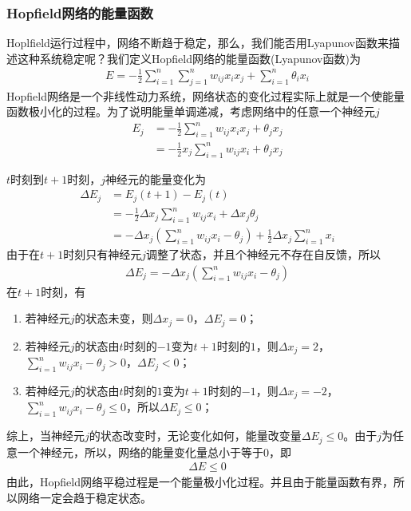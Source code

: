 {        \subsubsection{Hopfield网络的能量函数}
            \par
            Hoplfield运行过程中，网络不断趋于稳定，那么，我们能否用Lyapunov函数来描述这种系统稳定呢？我们定义Hopfield网络的能量函数(Lyapunov函数)为
            \begin{align*}
            E = -\frac{1}{2} \sum_{i=1}^n\sum_{j=1}^n w_{ij}x_ix_j+\sum_{i=1}^n\theta_ix_i
            \end{align*}
            Hopfield网络是一个非线性动力系统，网络状态的变化过程实际上就是一个使能量函数极小化的过程。为了说明能量单调递减，考虑网络中的任意一个神经元$j$
            \begin{align*}
            E_j & = -\frac{1}{2}\sum_{i=1}^n w_{ij}x_ix_j + \theta_jx_j\\
            & =-\frac{1}{2} x_j\sum_{i=1}^n w_{ij}x_i + \theta_j x_j
            \end{align*}
            \par
            $t$时刻到$t+1$时刻，$j$神经元的能量变化为
            \begin{align*}
            \Delta E_j & = E_j(t+1) - E_j(t) \\
            & =-\frac{1}{2} \Delta x_j\sum_{i=1}^nw_{ij}x_i +\Delta x_j\theta_j\\
            & =- \Delta x_j \left( \sum_{i=1}^nw_{ij}x_i - \theta_j \right) +\frac{1}{2}\Delta x_j \sum_{i=1}^n x_i
            \end{align*}
            由于在$t+1$时刻只有神经元$j$调整了状态，并且个神经元不存在自反馈，所以
            \begin{align*}
            \Delta E_j = -\Delta x_j \left( \sum_{i=1}^nw_{ij}x_i - \theta_j \right)
            \end{align*}
            在$t+1$时刻，有
            \begin{enumerate}
            \item 若神经元$j$的状态未变，则$\Delta x_j = 0$，$\Delta E_j =0 $；
            \item 若神经元$j$的状态由$t$时刻的$-1$变为$t+1$时刻的$1$，则$\Delta x_j = 2$，$ \sum_{i=1}^nw_{ij}x_i - \theta_j > 0$，$\Delta E_j <0$；
            \item 若神经元$j$的状态由$t$时刻的$1$变为$t+1$时刻的$-1$，则$\Delta x_j = -2$，$ \sum_{i=1}^nw_{ij}x_i - \theta_j \leqslant 0$，所以$\Delta E_j \leqslant 0$；
            \end{enumerate}
            综上，当神经元$j$的状态改变时，无论变化如何，能量改变量$\Delta E_j \leqslant 0$。由于$j$为任意一个神经元，所以，网络的能量变化量总小于等于0，即
            \begin{align*}
            \Delta E \leqslant 0
            \end{align*}
            由此，Hopfield网络平稳过程是一个能量极小化过程。并且由于能量函数有界，所以网络一定会趋于稳定状态。
}
